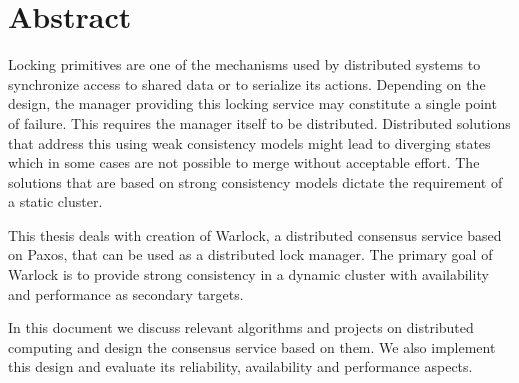 \chapter{Abstract}

Locking primitives are one of the mechanisms used by distributed systems
to synchronize access to shared data or to serialize its actions. Depending
on the design, the manager providing this locking service may constitute
a single point of failure. This requires the manager itself to be
distributed. Distributed solutions that address this using weak consistency 
models might lead to diverging states which in some cases are not possible to
merge without acceptable effort. The solutions that are based on strong
consistency models dictate the requirement of a static cluster.

This thesis deals with creation of Warlock, a distributed
consensus service based on Paxos, that can be used as a distributed lock 
manager. The primary goal of Warlock is to provide strong consistency in a
dynamic cluster with availability and performance as secondary targets.

In this document we discuss relevant algorithms and projects on distributed 
computing and design the consensus service based on them. We also implement 
this design and evaluate its reliability, availability and performance aspects.

